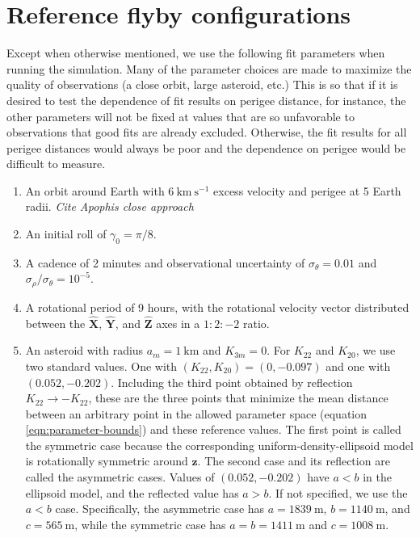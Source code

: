 \documentclass{aastex631}
\newcommand{\unit}[1]{\hat{\bm{#1}}}
\newcommand{\jtd}[1]{{\color{red}\textit{#1}}}
\newcommand{\siunit}[1]{\ \textrm{#1}}
\newcommand{\per}[1]{\ \textrm{#1}^{-1}}
\begin{document}
\vspace{5mm}



\appendix

\section{Reference flyby configurations}
\label{app:reference-config}
Except when otherwise mentioned, we use the following fit parameters when running the simulation. Many of the parameter choices are made to maximize the quality of observations (a close orbit, large asteroid, etc.) This is so that if it is desired to test the dependence of fit results on perigee distance, for instance, the other parameters will not be fixed at values that are so unfavorable to observations that good fits are already excluded. Otherwise, the fit results for all perigee distances would always be poor and the dependence on perigee would be difficult to measure.
\begin{enumerate}
  \item An orbit around Earth with $6\siunit{km}\per{s}$ excess velocity and perigee at 5 Earth radii. \jtd{Cite Apophis close approach}
  \item An initial roll of $\gamma_0=\pi/8$.
  \item A cadence of 2 minutes and observational uncertainty of $\sigma_\theta = 0.01$ and $\sigma_\rho / \sigma_\theta = 10^{-5}$.
  \item A rotational period of 9 hours, with the rotational velocity vector distributed between the $\unit X$, $\unit Y$, and $\unit Z$ axes in a $1:2:-2$ ratio.
  \item An asteroid with radius $a_m = 1\siunit{km}$ and $K_{3m}=0$. For $K_{22}$ and $K_{20}$, we use two standard values. One with $(K_{22}, K_{20}) = (0, -0.097)$ and one with $(0.052, -0.202)$. Including the third point obtained by reflection $K_{22}\rightarrow -K_{22}$, these are the three points that minimize the mean distance between an arbitrary point in the allowed parameter space (equation \ref{eqn:parameter-bounds}) and these reference values. The first point is called the symmetric case because the corresponding uniform-density-ellipsoid model is rotationally symmetric around $\unit z$. The second case and its reflection are called the asymmetric cases. Values of $(0.052, -0.202)$ have $a < b$ in the ellipsoid model, and the reflected value has $a > b$. If not specified, we use the $a < b$ case. Specifically, the asymmetric case has $a=1839\siunit{m}$, $b=1140\siunit{m}$, and $c=565\siunit{m}$, while the symmetric case has $a=b=1411\siunit{m}$ and $c=1008\siunit{m}$.
\end{enumerate}
\end{document}
